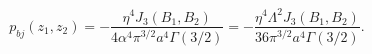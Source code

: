 \begin{equation}
p_{bj}(z_{1},z_{2})=-\frac{\eta^{4}J_3(B_1,B_2)}{4\alpha^{4}\pi
^{3/2}a^{4}\Gamma
(3/2)}=-\frac{\eta^{4}\Lambda^{2}J_3(B_1,B_2)}{36\pi
^{3/2}a^{4}\Gamma (3/2)}. \label{vacforce}
\end{equation}

